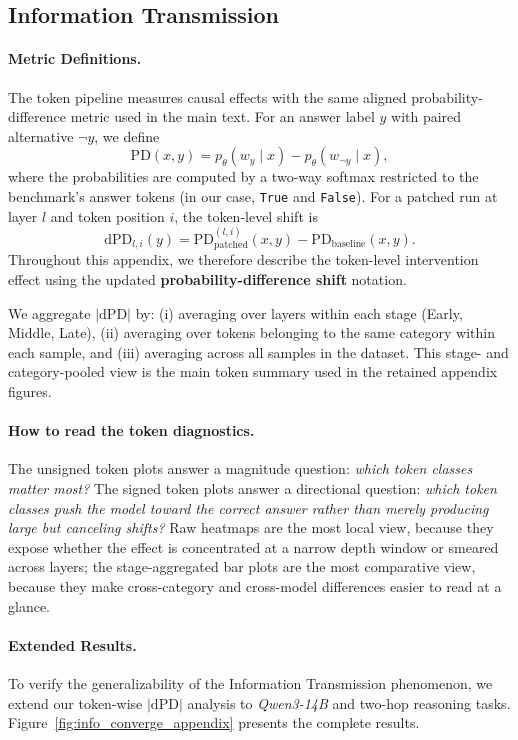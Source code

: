 \documentclass[11pt]{article}
\begin{document}
\subsection{Information Transmission}
\label{sec:appendix_info_converge}

\paragraph{Metric Definitions.}
The token pipeline measures causal effects with the same aligned probability-difference metric used in the main text. For an answer label $y$ with paired alternative $\neg y$, we define
$$\mathrm{PD}(x,y) = p_{\theta}(w_y\mid x) - p_{\theta}(w_{\neg y}\mid x),$$
where the probabilities are computed by a two-way softmax restricted to the benchmark's answer tokens (in our case, \texttt{True} and \texttt{False}). For a patched run at layer $l$ and token position $i$, the token-level shift is
$$\mathrm{dPD}_{l,i}(y) = \mathrm{PD}_{\mathrm{patched}}^{(l,i)}(x,y) - \mathrm{PD}_{\mathrm{baseline}}(x,y).$$
Throughout this appendix, we therefore describe the token-level intervention effect using the updated \textbf{probability-difference shift} notation.

We aggregate $|\mathrm{dPD}|$ by: (i) averaging over layers within each stage (Early, Middle, Late), (ii) averaging over tokens belonging to the same category within each sample, and (iii) averaging across all samples in the dataset. This stage- and category-pooled view is the main token summary used in the retained appendix figures.

\paragraph{How to read the token diagnostics.}
The unsigned token plots answer a magnitude question: \emph{which token classes matter most?} The signed token plots answer a directional question: \emph{which token classes push the model toward the correct answer rather than merely producing large but canceling shifts?} Raw heatmaps are the most local view, because they expose whether the effect is concentrated at a narrow depth window or smeared across layers; the stage-aggregated bar plots are the most comparative view, because they make cross-category and cross-model differences easier to read at a glance.

\paragraph{Extended Results.}
To verify the generalizability of the Information Transmission phenomenon, we extend our token-wise $|\mathrm{dPD}|$ analysis to \textit{Qwen3-14B} and two-hop reasoning tasks. Figure~\ref{fig:info_converge_appendix} presents the complete results.
\end{document}

